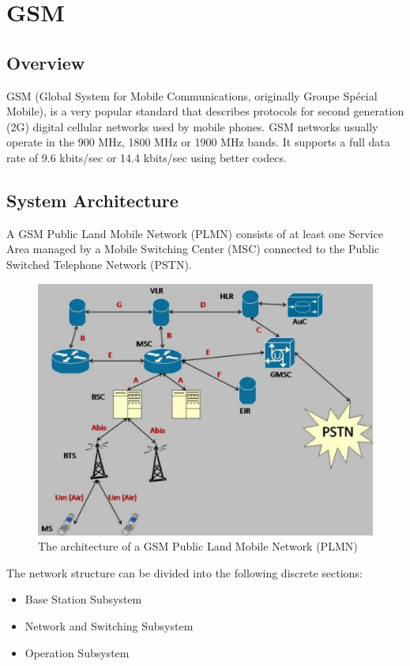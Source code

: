 \chapter{GSM}

\section{Overview}

GSM (Global System for Mobile Communications, originally Groupe Sp\'ecial 
Mobile), is a very popular standard that describes protocols for second 
generation (2G) digital cellular networks used by mobile phones. GSM networks 
usually operate in the 900 MHz, 1800 MHz or 1900 MHz bands. It supports a full
data rate of 9.6 kbits/sec or 14.4 kbits/sec using better codecs.


\section{System Architecture}

A GSM Public Land Mobile Network (PLMN) consists of at least one Service Area
managed by a Mobile Switching Center (MSC) connected to the Public Switched 
Telephone Network  (PSTN).

\begin{figure}
\centering
\includegraphics[scale=0.5]{../images/gsmNetwork}
\caption[GSM PLMN architecture]{The architecture of a GSM Public Land Mobile 
Network (PLMN) {\cite{gnuradioFullNet}}}
\end{figure}

The network structure can be divided into the following discrete sections:
\begin{itemize}[noitemsep,topsep=0pt,parsep=0pt,partopsep=0pt]
\item Base Station Subsystem
\item Network and Switching Subsystem
\item Operation Subsystem
\end{itemize}


